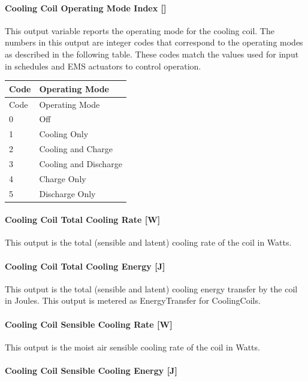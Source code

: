 \paragraph{Cooling Coil Operating Mode Index {[]}}\label{cooling-coil-operating-mode-index}

This output variable reports the operating mode for the cooling coil. The numbers in this output are integer codes that correspond to the operating modes as described in the following table. These codes match the values used for input in schedules and EMS actuators to control operation.

\begin{longtable}[c]{@{}ll@{}}
\toprule 
Code & Operating Mode \tabularnewline
\midrule
\endfirsthead

\toprule 
Code & Operating Mode \tabularnewline
\midrule
\endhead

0 & Off \tabularnewline
1 & Cooling Only \tabularnewline
2 & Cooling and Charge \tabularnewline
3 & Cooling and Discharge \tabularnewline
4 & Charge Only \tabularnewline
5 & Discharge Only \tabularnewline
\bottomrule
\end{longtable}

\paragraph{Cooling Coil Total Cooling Rate {[}W{]}}\label{cooling-coil-total-cooling-rate-w-10}

This output is the total (sensible and latent) cooling rate of the coil in Watts.

\paragraph{Cooling Coil Total Cooling Energy {[}J{]}}\label{cooling-coil-total-cooling-energy-j-10}

This output is the total (sensible and latent) cooling energy transfer by the coil in Joules. This output is metered as EnergyTransfer for CoolingCoils.

\paragraph{Cooling Coil Sensible Cooling Rate {[}W{]}}\label{cooling-coil-sensible-cooling-rate-w-10}

This output is the moist air sensible cooling rate of the coil in Watts.

\paragraph{Cooling Coil Sensible Cooling Energy {[}J{]}}\label{cooling-coil-sensible-cooling-energy-j-10}

